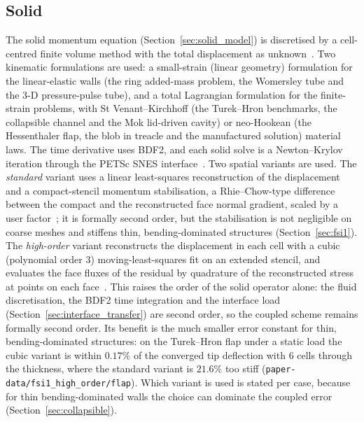\subsection{Solid}\label{sec:solid_solver}

The solid momentum equation (Section~\ref{sec:solid_model}) is discretised by a cell-centred finite volume method with the total displacement as unknown~\citep{Jasak2000, Cardiff2021}.
Two kinematic formulations are used: a small-strain (linear geometry) formulation for the linear-elastic walls (the ring added-mass problem, the Womersley tube and the 3-D pressure-pulse tube), and a total Lagrangian formulation for the finite-strain problems, with St Venant--Kirchhoff (the Turek--Hron benchmarks, the collapsible channel and the Mok lid-driven cavity) or neo-Hookean (the Hessenthaler flap, the blob in treacle and the manufactured solution) material laws.
The time derivative uses BDF2, and each solid solve is a Newton--Krylov iteration through the PETSc SNES interface~\citep{PETSc, Cardiff2026}.
Two spatial variants are used.
The \emph{standard} variant uses a linear least-squares reconstruction of the displacement and a compact-stencil momentum stabilisation, a Rhie--Chow-type difference between the compact and the reconstructed face normal gradient, scaled by a user factor~\citep{Cardiff2026}; it is formally second order, but the stabilisation is not negligible on coarse meshes and stiffens thin, bending-dominated structures (Section~\ref{sec:fsi1}).
The \emph{high-order} variant reconstructs the displacement in each cell with a cubic (polynomial order 3) moving-least-squares fit on an extended stencil, and evaluates the face fluxes of the residual by quadrature of the reconstructed stress at points on each face~\citep{Batistic2026}.
This raises the order of the solid operator alone: the fluid discretisation, the BDF2 time integration and the interface load (Section~\ref{sec:interface_transfer}) are second order, so the coupled scheme remains formally second order.
Its benefit is the much smaller error constant for thin, bending-dominated structures: on the Turek--Hron flap under a static load the cubic variant is within $0.17\%$ of the converged tip deflection with 6 cells through the thickness, where the standard variant is $21.6\%$ too stiff (\texttt{paper-data/fsi1\_high\_order/flap}).
Which variant is used is stated per case, because for thin bending-dominated walls the choice can dominate the coupled error (Section~\ref{sec:collapsible}).

